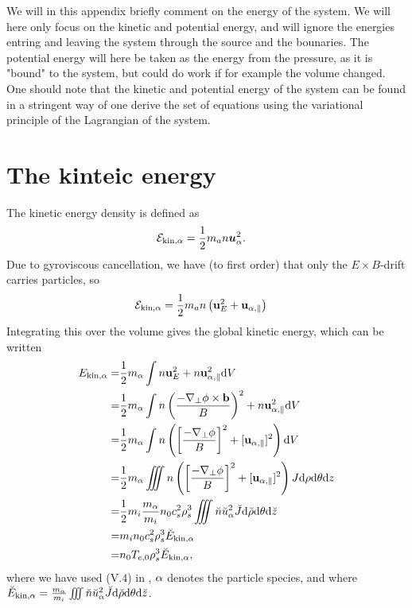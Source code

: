 We will in this appendix briefly comment on the energy of the system.
We will here only focus on the kinetic and potential energy, and will ignore the energies entring and leaving the system through the source and the bounaries.
The potential energy will here be taken as the energy from the pressure, as it is "bound" to the system, but could do work if for example the volume changed.
One should note that the kinetic and potential energy of the system can be found in a stringent way of one derive the set of equations using the variational principle of the Lagrangian of the system.

\section{The kinteic energy}
%
The kinetic energy density is defined as
%
\begin{align*}
    \mathcal{E}_{\text{kin},\alpha} &= \frac{1}{2}m_an \boldsymbol{u}^2_\alpha.
\end{align*}
%
Due to gyroviscous cancellation, we have (to first order) that only the $E\times B$-drift carries particles, so
%
\begin{align*}
    \mathcal{E}_{\text{kin},\alpha} &= \frac{1}{2}m_an \left(\mathbf{u}_E^2 + \mathbf{u}_{\alpha,\parallel}\right)
\end{align*}
%
Integrating this over the volume gives the global kinetic energy, which can be written
%
\begin{align*}
    E_{\text{kin},\alpha}
    =& \frac{1}{2}m_{\alpha}\int
       n\mathbf{u}_E^2
       + n\mathbf{u}_{\alpha,\parallel}^2 \text{d} V
     \\
    =& \frac{1}{2}m_{\alpha}\int
       n\left(\frac{-\nabla_\perp\phi
              \times\mathbf{b}}{B}\right)^2
       + n\mathbf{u}_{\alpha,\parallel}^2 \text{d} V
    \\
    =& \frac{1}{2}m_{\alpha}\int
       n\left(\left[\frac{-\nabla_\perp\phi}{B}\right]^2
       + [\mathbf{u}_{\alpha,\parallel}]^2\right) \text{d} V
   \\
    =& \frac{1}{2}m_{\alpha}\iiint
       n\left(\left[\frac{-\nabla_\perp\phi}{B}\right]^2
       + [\mathbf{u}_{\alpha,\parallel}]^2\right)
       J \text{d}\rho \text{d}\theta \text{d} z
    \\
    =& \frac{1}{2}m_i\frac{m_{\alpha}}{m_i}
       n_0c_s^2\rho_s^3
       \iiint
       \breve{n}\breve{u}_\alpha^2
       \breve{J} \text{d} \breve{\rho} \text{d}\theta \text{d} \breve{z}
    \\
    =& m_in_0c_s^2\rho_s^3 \breve{E}_{\text{kin},\alpha}
    \\
    =& n_0T_{e,0}\rho_s^3 \breve{E}_{\text{kin},\alpha},
\end{align*}
%
where we have used (V.4) in \cite{Dhaeseleer1991book}, $\alpha$ denotes the particle species, and where $\breve{E}_{\text{kin},\alpha} = \frac{m_{\alpha}}{m_i}\iiint \breve{n}\breve{u}_\alpha^2 \breve{J} \text{d} \breve{\rho} \text{d}\theta \text{d} \breve{z}$.

